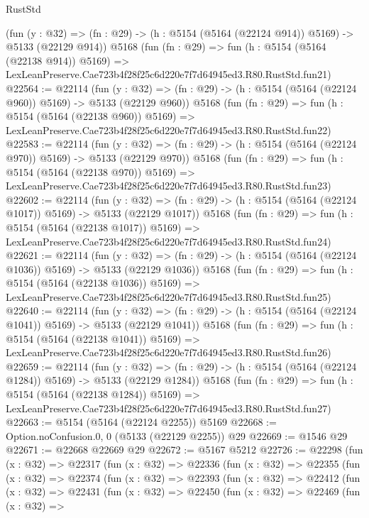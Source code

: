 \begin{lexlean}{RustStd}
\begin{coremodule}
    (fun (y : @32) => (fn : @29) -> (h : @5154 (@5164 (@22124 @914)) @5169) -> @5133 (@22129 @914))
    @5168
    (fun (fn : @29) =>
    fun (h : @5154 (@5164 (@22138 @914)) @5169) =>
    LexLeanPreserve.Cae723b4f28f25c6d220e7f7d64945ed3.R80.RustStd.fun21)
@22564 := @22114
    (fun (y : @32) => (fn : @29) -> (h : @5154 (@5164 (@22124 @960)) @5169) -> @5133 (@22129 @960))
    @5168
    (fun (fn : @29) =>
    fun (h : @5154 (@5164 (@22138 @960)) @5169) =>
    LexLeanPreserve.Cae723b4f28f25c6d220e7f7d64945ed3.R80.RustStd.fun22)
@22583 := @22114
    (fun (y : @32) => (fn : @29) -> (h : @5154 (@5164 (@22124 @970)) @5169) -> @5133 (@22129 @970))
    @5168
    (fun (fn : @29) =>
    fun (h : @5154 (@5164 (@22138 @970)) @5169) =>
    LexLeanPreserve.Cae723b4f28f25c6d220e7f7d64945ed3.R80.RustStd.fun23)
@22602 := @22114
    (fun (y : @32) =>
    (fn : @29) -> (h : @5154 (@5164 (@22124 @1017)) @5169) -> @5133 (@22129 @1017))
    @5168
    (fun (fn : @29) =>
    fun (h : @5154 (@5164 (@22138 @1017)) @5169) =>
    LexLeanPreserve.Cae723b4f28f25c6d220e7f7d64945ed3.R80.RustStd.fun24)
@22621 := @22114
    (fun (y : @32) =>
    (fn : @29) -> (h : @5154 (@5164 (@22124 @1036)) @5169) -> @5133 (@22129 @1036))
    @5168
    (fun (fn : @29) =>
    fun (h : @5154 (@5164 (@22138 @1036)) @5169) =>
    LexLeanPreserve.Cae723b4f28f25c6d220e7f7d64945ed3.R80.RustStd.fun25)
@22640 := @22114
    (fun (y : @32) =>
    (fn : @29) -> (h : @5154 (@5164 (@22124 @1041)) @5169) -> @5133 (@22129 @1041))
    @5168
    (fun (fn : @29) =>
    fun (h : @5154 (@5164 (@22138 @1041)) @5169) =>
    LexLeanPreserve.Cae723b4f28f25c6d220e7f7d64945ed3.R80.RustStd.fun26)
@22659 := @22114
    (fun (y : @32) =>
    (fn : @29) -> (h : @5154 (@5164 (@22124 @1284)) @5169) -> @5133 (@22129 @1284))
    @5168
    (fun (fn : @29) =>
    fun (h : @5154 (@5164 (@22138 @1284)) @5169) =>
    LexLeanPreserve.Cae723b4f28f25c6d220e7f7d64945ed3.R80.RustStd.fun27)
@22663 := @5154 (@5164 (@22124 @2255)) @5169
@22668 := Option.noConfusion.{0, 0} (@5133 (@22129 @2255)) @29
@22669 := @1546 @29
@22671 := @22668 @22669 @29
@22672 := @5167 @5212
@22726 := @22298
    (fun (x : @32) =>
    @22317
      (fun (x : @32) =>
      @22336
        (fun (x : @32) =>
        @22355
          (fun (x : @32) =>
          @22374
            (fun (x : @32) =>
            @22393
              (fun (x : @32) =>
              @22412
                (fun (x : @32) =>
                @22431
                  (fun (x : @32) =>
                  @22450
                    (fun (x : @32) =>
                    @22469
                      (fun (x : @32) =>

\end{coremodule}
\end{lexlean}
